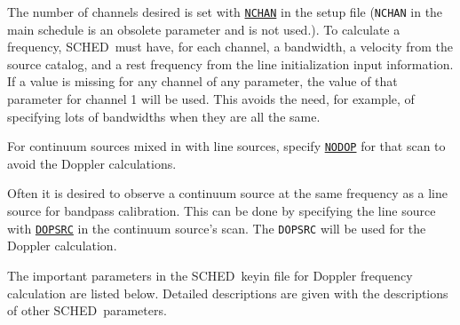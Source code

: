 \documentclass{report}
\newcommand{\schedb}{{\sc SCHED~}}
\begin{document}
The number of channels desired is set with 
{\hyperref[SP:NCHAN]{{\tt NCHAN}}}
in the setup file ({\tt NCHAN} in the main schedule
is an obsolete parameter and is not used.).  To calculate a frequency,
\schedb must have, for each channel, a bandwidth, a velocity from
the source catalog, and a rest frequency from the line initialization
input information.  If a value is missing for any channel of any
parameter, the value of that parameter for channel 1 will be
used. This avoids the need, for example, of specifying lots of
bandwidths when they are all the same.

For continuum sources mixed in with line sources, specify 
{\hyperref[MP:DOPPLER]{{\tt NODOP}}}
for that scan to avoid the Doppler calculations.

Often it is desired to observe a continuum source at the same
frequency as a line source for bandpass calibration. This can be done
by specifying the line source with 
{\hyperref[MP:DOPSRC]{{\tt DOPSRC}}}
in the continuum source's scan. The {\tt DOPSRC} will be used for the
Doppler calculation.

The important parameters in the \schedb keyin file for Doppler
frequency calculation are listed below. Detailed descriptions are
given with the descriptions of other \schedb parameters.
\end{document}
